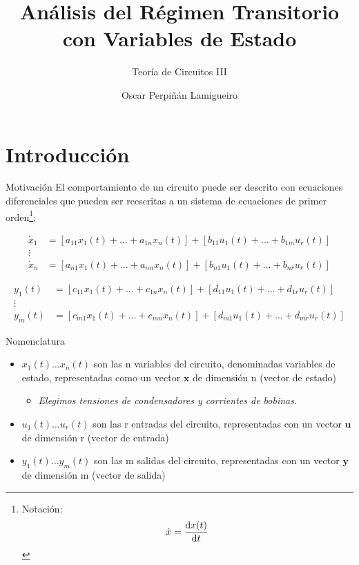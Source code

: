 \documentclass[aspectratio=169, usenames,svgnames,dvipsnames]{beamer}
\author{Oscar Perpiñán Lamigueiro}
\date{}
\title{Análisis del Régimen Transitorio con Variables de Estado}
\subtitle{Teoría de Circuitos III}
\begin{document}
\maketitle

\section{Introducción}
\label{sec:org4fc5912}
\begin{frame}[label={sec:org95312d3}]{Motivación}
El comportamiento de un circuito puede ser descrito con ecuaciones diferenciales que pueden ser reescritas a un sistema de ecuaciones de primer orden\footnote{Notación: \[\dot{x} = \diff{x(t)}{t}\]}:

\begin{align*}
  \dot{x}_1 &= \left[a_{11} x_1(t) + \dots + a_{1n} x_n(t)\right] + \left[b_{11} u_1(t) + \dots + b_{1m}u_r(t) \right]\\
  \vdots\\
    \dot{x}_n &= \left[a_{n1} x_1(t) + \dots + a_{nn} x_n(t)\right] + \left[b_{n1} u_1(t) + \dots + b_{nr}u_r(t) \right] 
\end{align*}

\begin{align*}
  y_1(t) &= \left[c_{11} x_1(t) + \dots + c_{1n} x_n(t)\right] + \left[d_{11} u_1(t) + \dots + d_{1r}u_r(t) \right]\\
  \vdots\\
    y_m(t) &= \left[c_{m1} x_1(t) + \dots + c_{mn} x_n(t)\right] + \left[d_{m1} u_1(t) + \dots + d_{mr}u_r(t) \right] 
\end{align*}
\end{frame}

\begin{frame}[label={sec:org0d10d1c}]{Nomenclatura}
\begin{itemize}
\item \(x_1(t) \dots x_n(t)\) son las \alert{n} variables del circuito, denominadas \alert{variables de estado}, representadas como un vector \(\mathbf{x}\) de dimensión n (\alert{vector de estado})
\begin{itemize}
\item \emph{Elegimos tensiones de condensadores y corrientes de bobinas}.
\end{itemize}
\end{itemize}
\pause
\begin{itemize}
\item \(u_1(t) \dots u_r(t)\) son las \alert{r} entradas del circuito, representadas con un vector \(\mathbf{u}\) de dimensión r (\alert{vector de entrada})
\end{itemize}
\pause
\begin{itemize}
\item \(y_1(t) \dots y_m(t)\) son las \alert{m} salidas del circuito, representadas con un vector \(\mathbf{y}\) de dimensión m (\alert{vector de salida})
\end{itemize}
\end{frame}
\end{document}
